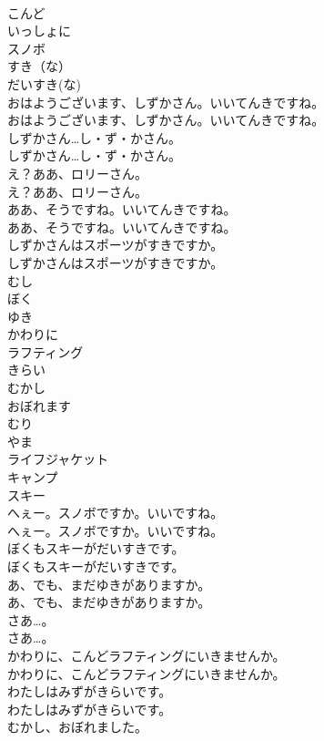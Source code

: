 \documentclass[8pt]{extreport}
\begin{document}
\begin{CJK}{UTF8}{min}
\\	こんど
\\	いっしょに
\\	スノボ
\\	すき（な）
\\	だいすき(な)
\\	おはようございます、しずかさん。いいてんきですね。	
\\	おはようございます、しずかさん。いいてんきですね。 
\\	しずかさん…し・ず・かさん。	
\\	しずかさん…し・ず・かさん。 
\\	え？ああ、ロリーさん。	
\\	え？ああ、ロリーさん。 
\\	ああ、そうですね。いいてんきですね。	
\\	ああ、そうですね。いいてんきですね。 
\\	しずかさんはスポーツがすきですか。	
\\	しずかさんはスポーツがすきですか。 
\\	むし
\\	ぼく
\\	ゆき
\\	かわりに
\\	ラフティング
\\	きらい
\\	むかし
\\	おぼれます
\\	むり
\\	やま
\\	ライフジャケット
\\	キャンプ
\\	スキー
\\	へぇー。スノボですか。いいですね。	
\\	へぇー。スノボですか。いいですね。 
\\	ぼくもスキーがだいすきです。	
\\	ぼくもスキーがだいすきです。 
\\	あ、でも、まだゆきがありますか。	
\\	あ、でも、まだゆきがありますか。 
\\	さあ…。	
\\	さあ…。 
\\	かわりに、こんどラフティングにいきませんか。	
\\	かわりに、こんどラフティングにいきませんか。 
\\	わたしはみずがきらいです。	
\\	わたしはみずがきらいです。 
\\	むかし、おぼれました。	

\end{CJK}
\end{document}
